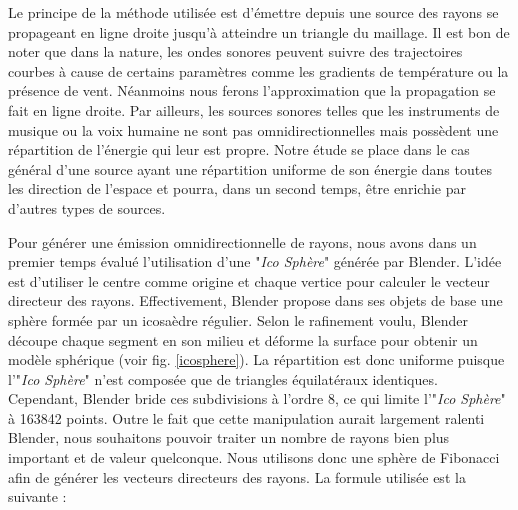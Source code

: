 Le principe de la méthode utilisée est d'émettre depuis une source des rayons se propageant en ligne droite jusqu'à atteindre un triangle du maillage. Il est bon de noter que dans la nature, les ondes sonores peuvent suivre des trajectoires courbes à cause de certains paramètres comme les gradients de température ou la présence de vent. Néanmoins nous ferons l'approximation que la propagation se fait en ligne droite. Par ailleurs, les sources sonores telles que les instruments de musique ou la voix humaine ne sont pas omnidirectionnelles mais possèdent une répartition de l'énergie qui leur est propre. Notre étude se place dans le cas général d'une source ayant une répartition uniforme de son énergie dans toutes les direction de l'espace et pourra, dans un second temps, être enrichie par d'autres types de sources. 

Pour générer une émission omnidirectionnelle de rayons, nous avons dans un premier temps évalué l'utilisation d'une "\textit{Ico Sphère}" générée par Blender. L'idée est d'utiliser le centre comme origine et chaque vertice pour calculer le vecteur directeur des rayons. Effectivement, Blender propose dans ses objets de base une sphère formée par un icosaèdre régulier. Selon le rafinement voulu, Blender découpe chaque segment en son milieu et déforme la surface pour obtenir un modèle sphérique (voir fig. \ref{icosphere}). La répartition est donc uniforme puisque l'"\textit{Ico Sphère}" n'est composée que de triangles équilatéraux identiques. Cependant, Blender bride ces subdivisions à l'ordre 8, ce qui limite l'"\textit{Ico Sphère}" à 163842 points. Outre le fait que cette manipulation aurait largement ralenti Blender, nous souhaitons pouvoir traiter un nombre de rayons bien plus important et de valeur quelconque. Nous utilisons donc une sphère de Fibonacci afin de générer les vecteurs directeurs des rayons. La formule utilisée est la suivante :

